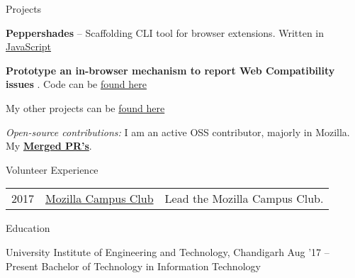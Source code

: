 \documentclass{resume} %
\begin{document}

\begin{rSection}{Projects}
  \begin{rProjectSection}
    \item \textbf {Peppershades} -- Scaffolding CLI tool for browser extensions. Written in \href{https://github.com/soniasingla/peppershades}{JavaScript}
    \item \textbf {Prototype an in-browser mechanism to report Web Compatibility issues} . Code can be \href{https://github.com/soniasingla/webcompataddon}{found here}
    \item My other projects can be \href{hhttps://soniasingla.com/#projects/}{found here}
  \end{rProjectSection}

  \begin{rBlurbSection}
    \item {\em Open-source contributions:}
      I am an active OSS contributor, majorly in Mozilla. My \href{https://bugzilla.mozilla.org/user_profile?user_id=632911}{\textbf{Merged PR's}}.
  \end{rBlurbSection}
\end{rSection}


\begin{rSection}{Volunteer Experience}
  \begin{tabular}{rll}
2017	     & {\href{https://github.com/moz-niec/}{Mozilla Campus Club}}  & Lead the Mozilla Campus Club.\\
\end{tabular}
\end{rSection}


\begin{rSection}{Education}
  \begin{rEducationSection}{University Institute of Engineering and Technology, Chandigarh}
                           {Aug '17 -- Present}
                           {Bachelor of Technology in Information Technology}
  \end{rEducationSection}
\end{rSection}
\end{document}
